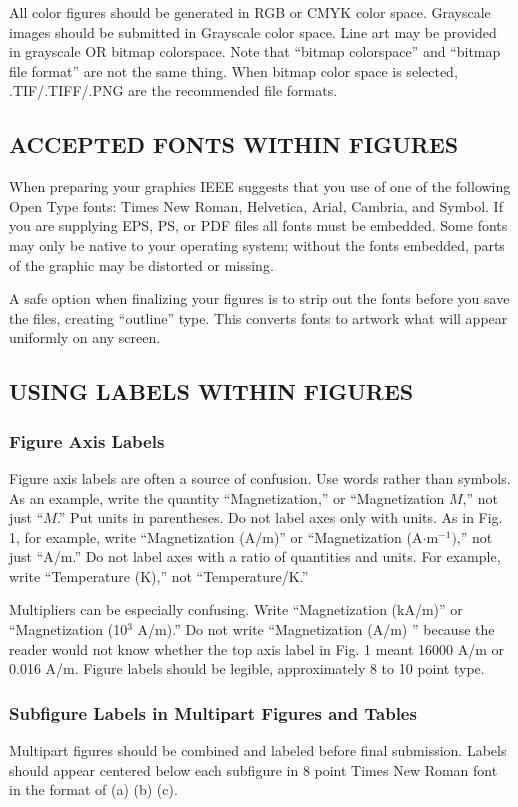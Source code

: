 \documentclass{IEEEoj}
\begin{document}
All color figures should be generated in RGB or CMYK color space. Grayscale 
images should be submitted in Grayscale color space. Line art may be 
provided in grayscale OR bitmap colorspace. Note that ``bitmap colorspace'' 
and ``bitmap file format'' are not the same thing. When bitmap color space 
is selected, .TIF/.TIFF/.PNG are the recommended file formats.

\subsection{ACCEPTED FONTS WITHIN FIGURES}
When preparing your graphics IEEE suggests that you use of one of the 
following Open Type fonts: Times New Roman, Helvetica, Arial, Cambria, and 
Symbol. If you are supplying EPS, PS, or PDF files all fonts must be 
embedded. Some fonts may only be native to your operating system; without 
the fonts embedded, parts of the graphic may be distorted or missing.

A safe option when finalizing your figures is to strip out the fonts before 
you save the files, creating ``outline'' type. This converts fonts to 
artwork what will appear uniformly on any screen.

\subsection{USING LABELS WITHIN FIGURES}
\subsubsection{Figure Axis Labels}
Figure axis labels are often a source of confusion. Use words rather than 
symbols. As an example, write the quantity ``Magnetization,'' or 
``Magnetization $M$,'' not just ``$M$.'' Put units in parentheses. Do not label 
axes only with units. As in Fig. 1, for example, write ``Magnetization 
(A/m)'' or ``Magnetization (A$\cdot $m$^{-1})$,'' not just ``A/m.'' Do not 
label axes with a ratio of quantities and units. For example, write 
``Temperature (K),'' not ``Temperature/K.'' 

Multipliers can be especially confusing. Write ``Magnetization (kA/m)'' or 
``Magnetization (10$^{3}$ A/m).'' Do not write ``Magnetization (A/m) 
'' because the reader would not know whether the top axis 
label in Fig. 1 meant 16000 A/m or 0.016 A/m. Figure labels should be 
legible, approximately 8 to 10 point type.

\subsubsection{Subfigure Labels in Multipart Figures and Tables}
Multipart figures should be combined and labeled before final submission. 
Labels should appear centered below each subfigure in 8 point Times New 
Roman font in the format of (a) (b) (c). 
\end{document}
